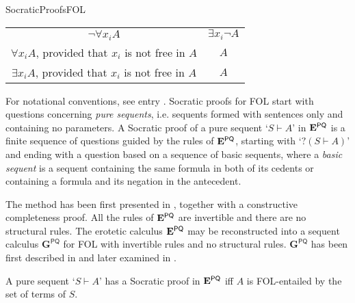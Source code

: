 \begin{entry}{SocraticProofsFOL}
\begin{calculus}
\begin{center}
\begin{tabular}{c|c}
$\neg\forall x_{i}A$ & $\exists x_{i}\neg A$ \\
			
$\forall x_{i}A$, provided that $x_{i}$ is not free in $A$ & $A$ \\
			
$\exists x_{i}A$, provided that $x_{i}$ is not free in $A$ & $A$ \\
	\end{tabular}

\end{center}
\end{calculus}

\begin{clarifications}
For notational conventions, see entry . Socratic proofs for FOL start with questions concerning \textit{pure sequents}, i.e. sequents formed with sentences only and containing no parameters. A Socratic proof of a pure sequent `$S \vdash A$' in $\mathbf{E}^\mathsf{PQ}$ is a finite sequence of questions guided by the rules of $\mathbf{E}^\mathsf{PQ}$, starting with `$? (S \vdash A)$' and ending with a question based on a sequence of basic sequents, where a \textit{basic sequent} is a sequent containing the same formula in both of its cedents or containing a formula and its negation in the antecedent.
\end{clarifications}

 \begin{history}
The method has been first presented in \cite{AW:2006SPQ}, together with a constructive completeness proof. All the rules of $\mathbf{E}^\mathsf{PQ}$ are invertible and there are no structural rules. The erotetic calculus $\mathbf{E}^\mathsf{PQ}$ may be reconstructed into a sequent calculus $\mathbf{G}^\mathsf{PQ}$ for FOL with invertible rules and no structural rules. $\mathbf{G}^\mathsf{PQ}$ has been first described in \cite{AW:2006SPQ} and later examined in \cite{LJUW:2013}.
\end{history}

\begin{technicalities}
A pure sequent `$S \vdash A$' has a Socratic proof in $\mathbf{E}^\mathsf{PQ}$ iff $A$ is FOL-entailed by the set of terms of $S$.
\end{technicalities}













\end{entry}
